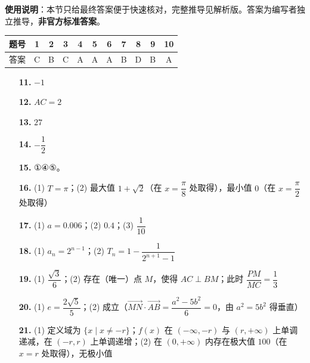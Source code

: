 
\begin{gknotice}
\textbf{使用说明}：本节只给最终答案便于快速核对，完整推导见解析版。答案为编写者独立推导，\textbf{非官方标准答案}。
\end{gknotice}

\begin{center}\begin{tabular}{ccccccccccc}
\toprule
题号 & 1 & 2 & 3 & 4 & 5 & 6 & 7 & 8 & 9 & 10 \\
\midrule
答案 & C & B & C & A & A & A & B & D & B & A \\
\bottomrule
\end{tabular}\end{center}

\begin{itemize}[leftmargin=2.6em]
  \item[\textbf{11.}] \(-1\)
  \item[\textbf{12.}] \(AC=2\)
  \item[\textbf{13.}] \(27\)
  \item[\textbf{14.}] \(-\dfrac{1}{2}\)
  \item[\textbf{15.}] ①④⑤。
\end{itemize}

\begin{itemize}[leftmargin=2.6em]
  \item[\textbf{16.}] (1) \(T=\pi\)；(2) 最大值 \(1+\sqrt{2}\)（在 \(x=\dfrac{\pi}{8}\) 处取得），最小值 \(0\)（在 \(x=\dfrac{\pi}{2}\) 处取得）
  \item[\textbf{17.}] (1) \(a=0.006\)；(2) \(0.4\)；(3) \(\dfrac{1}{10}\)
  \item[\textbf{18.}] (1) \(a_n=2^{n-1}\)；(2) \(T_n=1-\dfrac{1}{2^{n+1}-1}\)
  \item[\textbf{19.}] (1) \(\dfrac{\sqrt{3}}{6}\)；(2) 存在（唯一）点 \(M\)，使得 \(AC\perp BM\)；此时 \(\dfrac{PM}{MC}=\dfrac{1}{3}\)
  \item[\textbf{20.}] (1) \(e=\dfrac{2\sqrt{5}}{5}\)；(2) 成立（\(\overrightarrow{MN}\cdot\overrightarrow{AB}=\dfrac{a^2-5b^2}{6}=0\)，由 \(a^2=5b^2\) 得垂直）
  \item[\textbf{21.}] (1) 定义域为 \(\{x\mid x\neq-r\}\)；\(f(x)\) 在 \((-\infty,-r)\) 与 \((r,+\infty)\) 上单调递减，在 \((-r,r)\) 上单调递增；(2) 在 \((0,+\infty)\) 内存在极大值 \(100\)（在 \(x=r\) 处取得），无极小值
\end{itemize}
